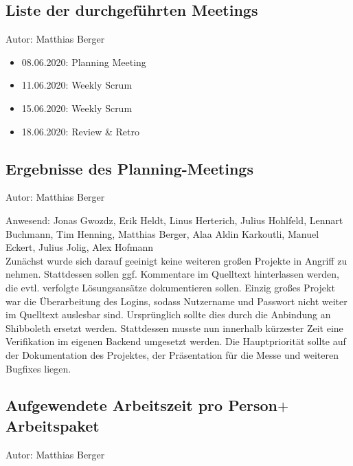 \subsection{Liste der durchgeführten Meetings}
{\small Autor: Matthias Berger}
\begin{itemize}
  \item 08.06.2020: Planning Meeting
  \item 11.06.2020: Weekly Scrum
  \item 15.06.2020: Weekly Scrum
  \item 18.06.2020: Review \& Retro
\end{itemize}


\subsection{Ergebnisse des Planning-Meetings}
{\small Autor: Matthias Berger}

Anwesend: Jonas Gwozdz, Erik Heldt, Linus Herterich, Julius Hohlfeld, Lennart Buchmann, Tim Henning, Matthias Berger, Alaa Aldin Karkoutli, Manuel Eckert, Julius Jolig, Alex Hofmann\\

Zunächst wurde sich darauf geeinigt keine weiteren großen Projekte in Angriff zu nehmen. Stattdessen sollen ggf. Kommentare im Quelltext hinterlassen werden, die evtl. verfolgte Lösungsansätze dokumentieren sollen. Einzig großes Projekt war die Überarbeitung des Logins, sodass Nutzername und Passwort nicht weiter im Quelltext auslesbar sind. Ursprünglich sollte dies durch die Anbindung an Shibboleth ersetzt werden. Stattdessen musste nun innerhalb kürzester Zeit eine Verifikation im eigenen Backend umgesetzt werden. Die Hauptpriorität sollte auf der Dokumentation des Projektes, der Präsentation für die Messe und weiteren Bugfixes liegen.

\subsection{Aufgewendete Arbeitszeit pro Person$+$Arbeitspaket}
{\small Autor: Matthias Berger}


